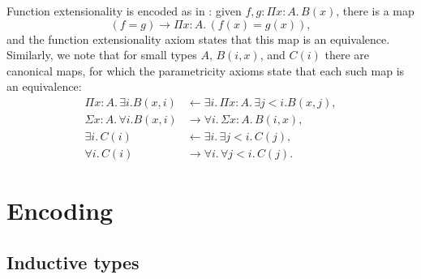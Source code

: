 \documentclass[10pt,a4paper]{article}
\theoremstyle{definition}
\theoremstyle{remark}
\renewcommand{\.}{.\,} %
\renewcommand{\:}{:} %
\newcommand{\0}{\mathbf{0}}
\newcommand{\1}{\mathbf{1}}
\newcommand\<\langle
\renewcommand\>\rangle
\theoremstyle{remark}
\begin{document}
Function extensionality is encoded as in \cite{hottbook}: given $f, g : \Pi x : A.\,B(x)$, there is a map \[
    (f = g) \to \Pi x : A.\, (f(x) = g(x)),
\] and the function extensionality axiom states that this map is an equivalence.
Similarly, we note that for small types \(A\), \(B(i,x)\), and \(C(i)\) there are canonical maps, for which the parametricity axioms state that each such map is an equivalence: 
\begin{align*}
    \Pi x : A.\,\exists i . B(x, i)&\leftarrow\exists i \. \Pi x : A. \, \exists j < i .B(x, j), \\
    \Sigma x:A.\,\forall i . B(x, i) &\to \forall i \. \Sigma x : A.\,B(i, x), \\
    \exists i \.  C(i)&\leftarrow \exists i \. \exists j < i \.C(j), \\
    \forall i \.  C(i) &\to \forall i \. \forall j < i \.C(j).
\end{align*} 

\newpage

\section{Encoding}

\label{appendix:encoding}
\subsection{Inductive types}
\end{document}
